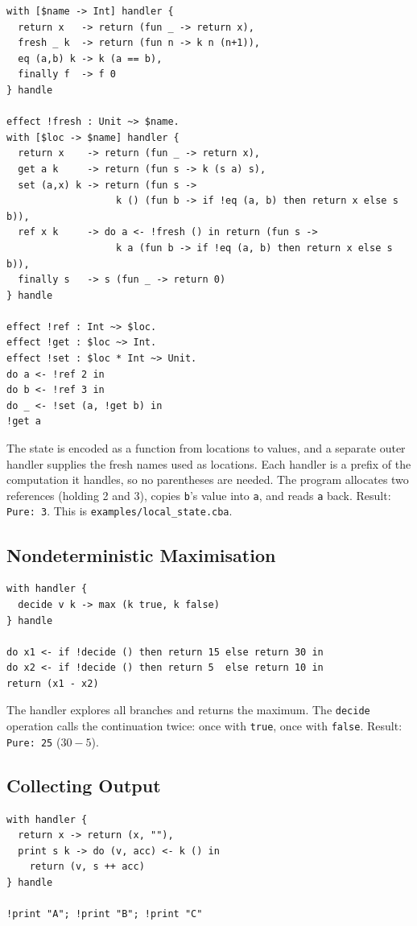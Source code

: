 \documentclass[11pt,a4paper]{article}
\newcommand{\cba}[1]{\lstinline[style=cbainline]{#1}}
\begin{document}
\begin{lstlisting}
with [$name -> Int] handler {
  return x   -> return (fun _ -> return x),
  fresh _ k  -> return (fun n -> k n (n+1)),
  eq (a,b) k -> k (a == b),
  finally f  -> f 0
} handle

effect !fresh : Unit ~> $name.
with [$loc -> $name] handler {
  return x    -> return (fun _ -> return x),
  get a k     -> return (fun s -> k (s a) s),
  set (a,x) k -> return (fun s ->
                   k () (fun b -> if !eq (a, b) then return x else s b)),
  ref x k     -> do a <- !fresh () in return (fun s ->
                   k a (fun b -> if !eq (a, b) then return x else s b)),
  finally s   -> s (fun _ -> return 0)
} handle

effect !ref : Int ~> $loc.
effect !get : $loc ~> Int.
effect !set : $loc * Int ~> Unit.
do a <- !ref 2 in
do b <- !ref 3 in
do _ <- !set (a, !get b) in
!get a
\end{lstlisting}

The state is encoded as a function from locations to values, and a separate
outer handler supplies the fresh names used as locations.  Each handler is a
prefix of the computation it handles, so no parentheses are needed.  The
program allocates two references (holding 2 and 3), copies \texttt{b}'s value
into \texttt{a}, and reads \texttt{a} back.  Result: \texttt{Pure: 3}.  This
is \texttt{examples/local\_state.cba}.

\subsection{Nondeterministic Maximisation}

\begin{lstlisting}
with handler {
  decide v k -> max (k true, k false)
} handle

do x1 <- if !decide () then return 15 else return 30 in
do x2 <- if !decide () then return 5  else return 10 in
return (x1 - x2)
\end{lstlisting}

The handler explores all branches and returns the maximum.  The \texttt{decide}
operation calls the continuation twice: once with \cba{true}, once with
\cba{false}.  Result: \texttt{Pure: 25} ($30 - 5$).

\subsection{Collecting Output}

\begin{lstlisting}
with handler {
  return x -> return (x, ""),
  print s k -> do (v, acc) <- k () in
    return (v, s ++ acc)
} handle

!print "A"; !print "B"; !print "C"
\end{lstlisting}
\end{document}
